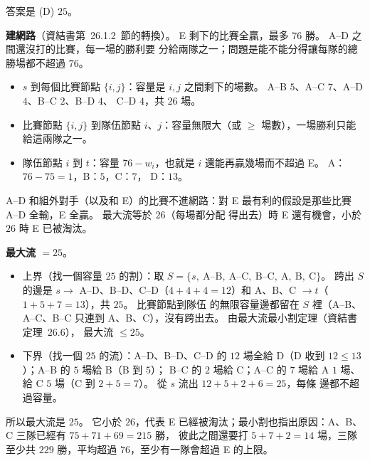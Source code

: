 \begin{pastsoln}
答案是 (D) $25$。

\textbf{建網路}（資結書第~26.1.2~節的轉換）。 E 剩下的比賽全贏，最多 $76$ 勝。 A--D 之間還沒打的比賽，每一場的勝利要
分給兩隊之一；問題是能不能分得讓每隊的總勝場都不超過 $76$。
\begin{itemize}
\item $s$ 到每個比賽節點 $\{i, j\}$：容量是 $i, j$ 之間剩下的場數。 A--B $5$、A--C $7$、A--D $4$、B--C $2$、B--D $4$、
C--D $4$，共 $26$ 場。
\item 比賽節點 $\{i, j\}$ 到隊伍節點 $i$、$j$：容量無限大（或 $\ge$ 場數），一場勝利只能給這兩隊之一。
\item 隊伍節點 $i$ 到 $t$：容量 $76 - w_i$，也就是 $i$ 還能再贏幾場而不超過 E。 A：$76 - 75 = 1$，B：$5$，C：$7$，
D：$13$。
\end{itemize}
A--D 和組外對手（以及和 E）的比賽不進網路：對 E 最有利的假設是那些比賽 A--D 全輸，E 全贏。 最大流等於 $26$（每場都分配
得出去）時 E 還有機會，小於 $26$ 時 E 已被淘汰。

\textbf{最大流 $= 25$}。
\begin{itemize}
\item 上界（找一個容量 $25$ 的割）：取 $S = \{s,\ \text{A--B},\ \text{A--C},\ \text{B--C},\ \text{A},\ \text{B},\ \text{C}\}$。
跨出 $S$ 的邊是 $s \to$ A--D、B--D、C--D（$4 + 4 + 4 = 12$）和 A、B、C $\to t$（$1 + 5 + 7 = 13$），共 $25$。 比賽節點到隊伍
的無限容量邊都留在 $S$ 裡（A--B、A--C、B--C 只連到 A、B、C），沒有跨出去。 由最大流最小割定理（資結書定理~26.6），
最大流 $\le 25$。
\item 下界（找一個 $25$ 的流）：A--D、B--D、C--D 的 $12$ 場全給 D（D 收到 $12 \le 13$）；A--B 的 $5$ 場給 B（B 到 $5$）；
B--C 的 $2$ 場給 C；A--C 的 $7$ 場給 A $1$ 場、給 C $5$ 場（C 到 $2 + 5 = 7$）。 從 $s$ 流出 $12 + 5 + 2 + 6 = 25$，每條
邊都不超過容量。
\end{itemize}
所以最大流是 $25$。 它小於 $26$，代表 E 已經被淘汰；最小割也指出原因：A、B、C 三隊已經有 $75 + 71 + 69 = 215$ 勝，
彼此之間還要打 $5 + 7 + 2 = 14$ 場，三隊至少共 $229$ 勝，平均超過 $76$，至少有一隊會超過 E 的上限。
\end{pastsoln}
